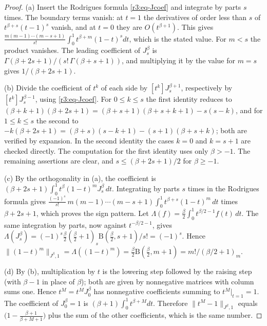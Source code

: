 \documentclass[11pt]{amsart}
\theoremstyle{definition}
\theoremstyle{remark}
\numberwithin{equation}{section}
\newcommand{\nrm}[1]{\lVert #1\rVert}
\begin{document}
\begin{proof}
(a) Insert the Rodrigues formula \eqref{r3:eq-Jcoef} and integrate by parts $s$ times. The boundary terms vanish: at $t=1$ the derivatives of order less than $s$ of $t^{\beta+s}(t-1)^s$ vanish, and at $t=0$ they are $O(t^{\beta+1})$. This gives $\frac{m(m-1)\cdots(m-s+1)}{s!}\int_0^1t^{\beta+m}(1-t)^sdt$, which is the stated value. For $m<s$ the product vanishes. The leading coefficient of $J^\beta_s$ is $\Gamma(\beta+2s+1)/(s!\,\Gamma(\beta+s+1))$, and multiplying it by the value for $m=s$ gives $1/(\beta+2s+1)$.

(b) Divide the coefficient of $t^k$ of each side by $[t^k]J^{\beta+1}_s$, respectively by $[t^k]J^{\beta-1}_s$, using \eqref{r3:eq-Jcoef}. For $0\leq k\leq s$ the first identity reduces to $(\beta+k+1)(\beta+2s+1)=(\beta+s+1)(\beta+s+k+1)-s(s-k)$, and for $1\leq k\leq s$ the second to $-k(\beta+2s+1)=(\beta+s)(s-k+1)-(s+1)(\beta+s+k)$; both are verified by expansion. In the second identity the cases $k=0$ and $k=s+1$ are checked directly. The computation for the first identity uses only $\beta>-1$. The remaining assertions are clear, and $s\leq(\beta+2s+1)/2$ for $\beta\geq-1$.

(c) By the orthogonality in (a), the coefficient is $(\beta+2s+1)\int_0^1t^\beta(1-t)^mJ^\beta_s\,dt$. Integrating by parts $s$ times in the Rodrigues formula gives $\frac{(-1)^s}{s!}\,m(m-1)\cdots(m-s+1)\int_0^1t^{\beta+s}(1-t)^m\,dt$ times $\beta+2s+1$, which proves the sign pattern. Let $\Lambda(f)=\frac\beta2\int_0^1t^{\beta/2-1}f(t)\,dt$. The same integration by parts, now against $t^{-\beta/2-1}$, gives $\Lambda(J^\beta_s)=(-1)^s\frac\beta2(\frac\beta2+1)_s\mathrm B(\frac\beta2,s+1)/s!=(-1)^s$. Hence $\nrm{(1-t)^m}_{J^\beta,1}=\Lambda((1-t)^m)=\frac\beta2\mathrm B(\frac\beta2,m+1)=m!/(\beta/2+1)_m$.

(d) By (b), multiplication by $t$ is the lowering step followed by the raising step (with $\beta-1$ in place of $\beta$); both are given by nonnegative matrices with column sums one. Hence $t^M=t^MJ^\beta_0$ has nonnegative coefficients summing to $t^M|_{t=1}=1$. The coefficient of $J^\beta_0=1$ is $(\beta+1)\int_0^1t^{\beta+M}dt$. Therefore $\nrm{t^M-1}_{J^\beta,1}$ equals $\big(1-\frac{\beta+1}{\beta+M+1}\big)$ plus the sum of the other coefficients, which is the same number.
\end{proof}
\end{document}
